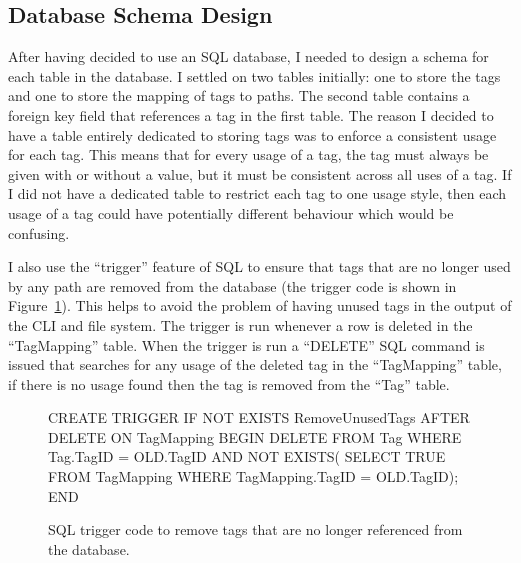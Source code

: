 
\subsection{Database Schema Design}

After having decided to use an SQL database, I needed to design a schema for
each table in the database. I settled on two tables initially: one to store the
tags and one to store the mapping of tags to paths. The second table contains a
foreign key field that references a tag in the first table.
The reason I decided to have a table entirely dedicated to storing tags was to
enforce a consistent usage for each tag. This means that for every usage of a
tag, the tag must always be given with or without a value, but it must be
consistent across all uses of a tag. If I did not have a dedicated table to
restrict each tag to one usage style, then each usage of a tag could have
potentially different behaviour which would be confusing.

I also use the ``trigger'' feature of SQL to ensure that tags that are no
longer used by any path are removed from the database (the trigger code is
shown in Figure~\ref{fig:sql-trigger}). This helps to avoid the problem of
having unused tags in the output of the CLI and file system. The trigger is run
whenever a row is deleted in the ``TagMapping'' table. When the trigger is run
a ``DELETE'' SQL command is issued that searches for any usage of the deleted
tag in the ``TagMapping'' table, if there is no usage found then the tag is
removed from the ``Tag'' table.

\begin{figure}[h]
    \centering
    \begin{boxedverbatim}

CREATE TRIGGER IF NOT EXISTS
RemoveUnusedTags AFTER DELETE ON TagMapping
BEGIN
  DELETE FROM Tag
  WHERE
    Tag.TagID = OLD.TagID
    AND NOT EXISTS(
      SELECT TRUE
      FROM TagMapping
      WHERE TagMapping.TagID = OLD.TagID);
END
    \end{boxedverbatim}
    \caption[SQL Trigger Code]{SQL trigger code to remove tags that are no
    longer referenced from the database.}
    \label{fig:sql-trigger}
\end{figure}


